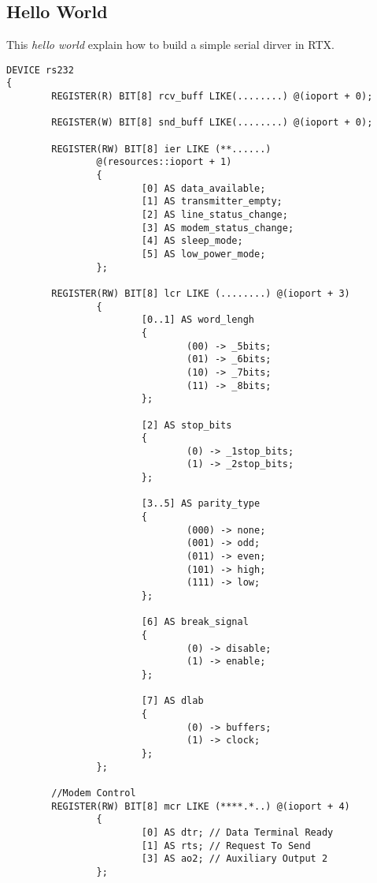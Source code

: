 \documentclass[american]{rtxreport}
\begin{document}
\subsection{Hello World}

This \emph{hello world} explain how to build a simple serial dirver in RTX.

\begin{lstlisting}
DEVICE rs232
{
        REGISTER(R) BIT[8] rcv_buff LIKE(........) @(ioport + 0);

        REGISTER(W) BIT[8] snd_buff LIKE(........) @(ioport + 0);

        REGISTER(RW) BIT[8] ier LIKE (**......)
                @(resources::ioport + 1)
                {
                        [0] AS data_available;
                        [1] AS transmitter_empty;
                        [2] AS line_status_change;
                        [3] AS modem_status_change;
                        [4] AS sleep_mode;
                        [5] AS low_power_mode;
                };

        REGISTER(RW) BIT[8] lcr LIKE (........) @(ioport + 3)
                {
                        [0..1] AS word_lengh
                        {
                                (00) -> _5bits;
                                (01) -> _6bits;
                                (10) -> _7bits;
                                (11) -> _8bits;
                        };

                        [2] AS stop_bits
                        {
                                (0) -> _1stop_bits;
                                (1) -> _2stop_bits;
                        };

                        [3..5] AS parity_type
                        {
                                (000) -> none;
                                (001) -> odd;
                                (011) -> even;
                                (101) -> high;
                                (111) -> low;
                        };

                        [6] AS break_signal
                        {
                                (0) -> disable;
                                (1) -> enable;
                        };

                        [7] AS dlab
                        {
                                (0) -> buffers;
                                (1) -> clock;
                        };
                };

        //Modem Control
        REGISTER(RW) BIT[8] mcr LIKE (****.*..) @(ioport + 4)
                {
                        [0] AS dtr; // Data Terminal Ready
                        [1] AS rts; // Request To Send
                        [3] AS ao2; // Auxiliary Output 2
                };


\end{lstlisting}
\end{document}
